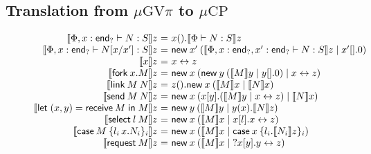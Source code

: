 \documentclass[orivec,envcountsame]{llncs}
\makeatletter
\newcommand{\cpdual}[1]{#1^\perp}
\newcommand{\interm}{\mkwd{end}_?}
\newcommand{\cptyp}[2]{#1 \vdash #2}
\newcommand{\gvtyp}[3]{#1 \vdash #2 : #3}
\newcommand{\mkwd}[1]{\mathsf{#1}}
\newcommand{\link}[2]{#1 \leftrightarrow #2}
\newcommand{\cut}[4]{\mkwd{new}\:#1 \: (#3 \mid #4)}
\newcommand{\derelict}[2]{{?#1[#2]}}
\renewcommand{\case}[2]{\mkwd{case}\:#1\:\{#2\}}
\newcommand{\gvsend}[2]{\mkwd{send}\:#1\:#2}
\newcommand{\gvreceive}[1]{\mkwd{receive}\:#1}
\newcommand{\gvlet}[3]{\mkwd{let}\;#1 = #2\;\mkwd{in}\;#3}
\newcommand{\gvselect}[2]{\mkwd{select}\:#1\:#2}
\newcommand{\gvcase}[2]{\mkwd{case}\:#1\:\{#2\}}
\newcommand{\gvlink}[2]{\mkwd{link}\:#1\:#2}
\newcommand{\gvfork}[2]{\mkwd{fork}\:#1.#2}
\newcommand{\gvrequest}[1]{\mkwd{request}\:#1}
\newcommand{\tocp}[1]{\llbracket #1 \rrbracket}
\newcommand{\mucp}{$\mu\mathrm{CP}$\xspace}
\newcommand{\gvpi}{$\mu\mathrm{GV}\pi$\xspace}
\newcommand{\ba}{\begin{array}}
\newcommand{\ea}{\end{array}}
\newenvironment{equations}{\[\ba{@{}r@{~}c@{~}l@{}}}{\ea\]}
\makeatother
\begin{document}
\subsection{Translation from \gvpi to \mucp}\label{sec:gvpitocp}

\begin{figure}[float]
\vspace{-2ex}
\small
\begin{equations}
\tocp{\gvtyp{\Phi,x:\interm}{N}{S}}z &=& x().\tocp{\gvtyp{\Phi}{N}{S}}z \\
\tocp{\gvtyp{\Phi,x:\interm}{N[x/x']}{S}}z &=& 
  \cut{x'}{}{\tocp{\gvtyp{\Phi,x:\interm,x':\interm}{N}{S}}z}{x'[].0} \\
\tocp{x}z &=& \link{x}{z} \\
\tocp{\gvfork{x}{M}}z &=& \cut{x}{}{\cut{y}{}{\tocp{M}y}{y[].0}}{\link{x}{z}} \\
\tocp{\gvlink{M}{N}}z &=& z().\cut{x}{}{\tocp{M}x}{\tocp{N}x} \\
\tocp{\gvsend{M}{N}}z &=& \cut{x}{}{x[y].(\tocp{M}y \mid \link{x}{z})}{\tocp{N}x} \\
\tocp{\gvlet{(x,y)}{\gvreceive{M}}{M}}z &=& \cut{y}{}{\tocp{M}y}{y(x).\tocp{N}z} \\
\tocp{\gvselect{l}{M}}z &=& \cut{x}{}{\tocp{M}x}{x[l].\link{x}{z}} \\
\tocp{\gvcase{M}{l_i\,x.N_i}_i}z &=&  \cut{x}{}{\tocp{M}x}{\case{x}{l_i.\tocp{N_i}z}_i} \\
\tocp{\gvrequest{M}}z &=& \cut{x}{}{\tocp{M}x}{\derelict{x}{y}.\link{y}{z}} \\

\end{equations}
\end{figure}
\end{document}
